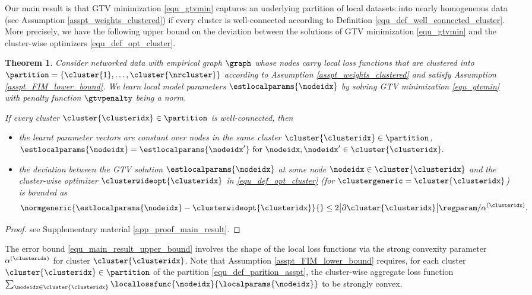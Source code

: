 \documentclass[lettersize,journal]{IEEEtran}
\newcommand\strongconvparam[1]{\alpha^{(#1)}}
\newtheorem{theorem}{Theorem}%
\begin{document}
Our main result is that GTV minimization \eqref{equ_gtvmin} captures an underlying partition of local datasets into nearly 
homogeneous data (see Assumption \ref{asspt_weights_clustered}) if every cluster is well-connected according to 
Definition \ref{equ_def_well_connected_cluster}. More precisely, we have the following upper bound on the deviation 
between the solutions of GTV minimization \eqref{equ_gtvmin} and the cluster-wise optimizers \eqref{equ_def_opt_cluster}. 
\begin{theorem}
\label{thm_main_result}
Consider networked data with empirical graph $\graph$ whose nodes carry local loss functions that are 
clustered into $\partition = \{ \cluster{1},\ldots,\cluster{\nrcluster} \}$ according to Assumption \ref{asspt_weights_clustered} 
and satisfy Assumption \ref{asspt_FIM_lower_bound}. We learn local model parameters $\estlocalparams{\nodeidx}$ 
by solving GTV minimization \eqref{equ_gtvmin} with penalty function $\gtvpenalty$ being a norm. 

If every cluster $\cluster{\clusteridx} \in \partition$ is well-connected, then 
\begin{itemize}
\item the learnt parameter vectors are constant over nodes in the same cluster $\cluster{\clusteridx} \in \partition$, $
	 \estlocalparams{\nodeidx} = \estlocalparams{\nodeidx'} \mbox{ for } \nodeidx,\nodeidx' \in \cluster{\clusteridx}.$
\item the deviation between the GTV solution $\estlocalparams{\nodeidx}$ at some node $\nodeidx \in \cluster{\clusteridx}$ 
and the cluster-wise optimizer $\clusterwideopt{\clusteridx}$ in \eqref{equ_def_opt_cluster} (for $\clustergeneric=\cluster{\clusteridx}$) 
is bounded as 
\begin{equation} 
	\label{equ_main_result_upper_bound}
	\normgeneric{ \estlocalparams{\nodeidx}  - \clusterwideopt{\clusteridx}}{} \leq  2 \big| \partial\cluster{\clusteridx} \big| \regparam/\strongconvparam{\clusteridx}.
 \vspace{-2mm}
\end{equation} 
\end{itemize}
\end{theorem} 
\begin{proof} 
see Supplementary material \ref{app_proof_main_result}. 
\end{proof} 
The error bound \eqref{equ_main_result_upper_bound} involves the shape of the local loss functions via the strong convexity 
parameter $\strongconvparam{\clusteridx}$ for cluster $\cluster{\clusteridx}$. Note that Assumption 
\ref{asspt_FIM_lower_bound} requires, for each cluster $\cluster{\clusteridx} \in \partition$ of the 
partition \eqref{equ_def_parition_asspt}, the cluster-wise aggregate loss function $\sum_{\nodeidx\in \cluster{\clusteridx}} \locallossfunc{\nodeidx}{\localparams{\nodeidx}}$ to be strongly convex. 
\end{document}
